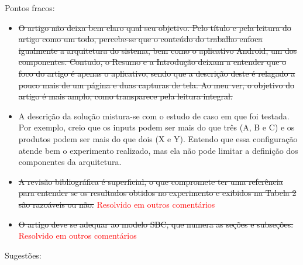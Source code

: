 \documentclass[12pt]{article}
\begin{document}
Pontos fracos:

\begin{itemize}

\item \sout{O artigo não deixa bem claro qual seu objetivo. Pelo título e pela leitura do artigo como um todo, percebe-se que o conteúdo do trabalho enfoca igualmente a arquitetura do sistema, bem como o aplicativo Android, um dos componentes. Contudo, o Resumo e a Introdução deixam a entender que o foco do artigo é apenas o aplicativo, sendo que a descrição deste é relagado a pouco mais de um página e duas capturas de tela. Ao meu ver, o objetivo do artigo é mais amplo, como transparece pela leitura integral.}

\item A descrição da solução mistura-se com o estudo de caso em que foi testada. Por exemplo, creio que os inputs podem ser mais do que três (A, B e C) e os produtos podem ser mais do que dois (X e Y). Entendo que essa configuração atende bem o experimento realizado, mas ela não pode limitar a definição dos componentes da arquitetura.

\item \sout{A revisão bibliográfica é superficial, o que compromete ter uma referência para entender se os resultados obtidos no experimento e exibidos na Tabela 2 são razoáveis ou não.} \textcolor{red}{Resolvido em outros comentários}

\item \sout{O artigo deve se adequar ao modelo SBC, que numera as seções e subseções.} \textcolor{red}{Resolvido em outros comentários}

\end{itemize}

Sugestões:
\end{document}
